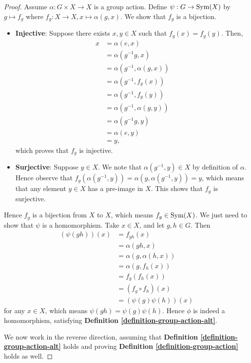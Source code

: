 \begin{proof}
    Assume $\alpha: G \times X \to X$ is a group action. Define $\psi: G \to \mathrm{Sym}(X)$ by $g \mapsto f_g$ where $f_g: X \to X, x \mapsto \alpha(g, x)$. We show that $f_g$ is a bijection.
    \begin{itemize}
        \item \textbf{Injective}: Suppose there exists $x, y \in X$ such that $f_g(x) = f_g(y)$. Then,
        \begin{align*}
            x &= \alpha(e, x)\\
            &= \alpha(g^{-1}g, x)\\
            &= \alpha(g^{-1}, \alpha(g, x))\\
            &= \alpha(g^{-1}, f_g(x))\\
            &= \alpha(g^{-1}, f_g(y))\\
            &= \alpha(g^{-1}, \alpha(g, y))\\
            &= \alpha(g^{-1}g, y)\\
            &= \alpha(e, y)\\
            &= y,
        \end{align*}
        which proves that $f_g$ is injective.
        \item \textbf{Surjective}: Suppose $y \in X$. We note that $\alpha(g^{-1}, y) \in X$ by definition of $\alpha$. Hence observe that $f_g(\alpha(g^{-1}, y)) = \alpha(g, \alpha(g^{-1}, y)) = y$, which means that any element $y \in X$ has a pre-image in $X$. This shows that $f_g$ is surjective.
    \end{itemize}
    Hence $f_g$ is a bijection from $X$ to $X$, which means $f_g \in \mathrm{Sym}(X)$. We just need to show that $\psi$ is a homomorphism. Take $x \in X$, and let $g, h \in G$. Then
    \begin{align*}
        (\psi(gh))(x) &= f_{gh}(x)\\
        &= \alpha(gh, x)\\
        &= \alpha(g, \alpha(h, x))\\
        &= \alpha(g, f_h(x))\\
        &= f_g(f_h(x))\\
        &= (f_g \circ f_h)(x)\\
        &= (\psi(g)\psi(h))(x)
    \end{align*}
    for any $x \in X$, which means $\psi(gh) = \psi(g)\psi(h)$. Hence $\phi$ is indeed a homomorphism, satisfying \textbf{Definition \ref{definition-group-action-alt}}.

    We now work in the reverse direction, assuming that \textbf{Definition \ref{definition-group-action-alt}} holds and proving \textbf{Definition \ref{definition-group-action}} holds as well.
    

\end{proof}
